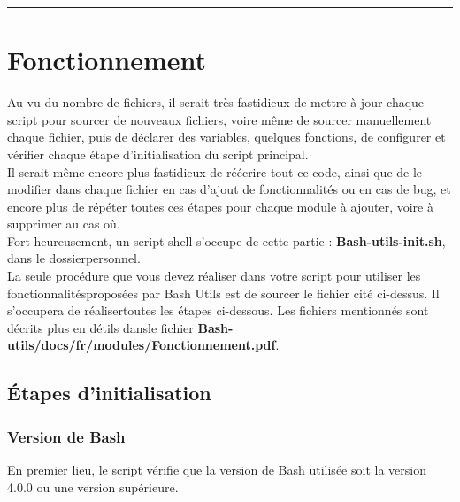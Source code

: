 \documentclass[a4paper,10pt]{article}
\begin{document}
\color{red}\par\noindent\rule{\textwidth}{0.4pt}\color{white}

\color{red}
\section{Fonctionnement}\color{white}
Au vu du nombre de fichiers, il serait très fastidieux de mettre à jour chaque script pour sourcer de nouveaux fichiers, voire même de sourcer manuellement chaque fichier, puis de déclarer des variables, quelques fonctions, de configurer et vérifier chaque étape d'initialisation du script principal.\\[1\baselineskip]

Il serait même encore plus fastidieux de réécrire tout ce code, ainsi que de le modifier dans chaque fichier en cas d'ajout de fonctionnalités ou en cas de bug, et encore plus de répéter toutes ces étapes pour chaque module à ajouter, voire à supprimer au cas où.\\[1\baselineskip]

Fort heureusement, un script shell s'occupe de cette partie : \color{lime}\textbf{Bash-utils-init.sh}\color{white}, dans le dossier\linebreak personnel.\\[1\baselineskip]

La seule procédure que vous devez réaliser dans votre script pour utiliser les fonctionnalités\linebreak proposées par Bash Utils est de sourcer le fichier cité ci-dessus. Il s'occupera de réaliser\linebreak toutes les étapes ci-dessous. Les fichiers mentionnés sont décrits plus en détils dans\linebreak le fichier \textbf{\color{lime}Bash-utils/docs/fr/modules/Fonctionnement.pdf\color{white}}.


\color{green}
\subsection{Étapes d'initialisation}\color{white}




\color{blue}
\subsubsection{Version de Bash}\color{white}
En premier lieu, le script vérifie que la version de Bash utilisée soit la version 4.0.0 ou une version supérieure.\\[1\baselineskip]
\end{document}
